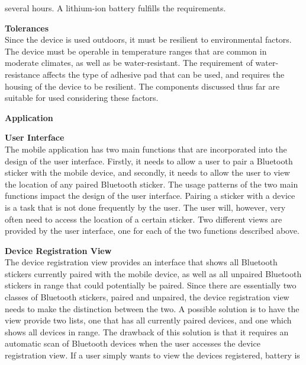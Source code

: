 \documentclass[12pt]{article}
\begin{document}
\begin{packed_enum}
\begin{packed_enum}
\begin{packed_enum}
        several hours. A lithium-ion battery fulfills the requirements.
      \end{packed_enum}
      \item \textbf{Tolerances} \\
      Since the device is used outdoors, it must be resilient to environmental factors. The device must be
      operable in temperature ranges that are common in moderate climates, as well as be water-resistant. The
      requirement of water-resistance affects the type of adhesive pad that can be used, and requires the
      housing of the device to be resilient. The components discussed thus far are suitable for used considering
      these factors.
    \end{packed_enum}
    \item \textbf{Application}
    \begin{packed_enum}
      \item \textbf{User Interface} \\
      The mobile application has two main functions that are incorporated into the design of the user interface.
      Firstly, it needs to allow a user to pair a Bluetooth sticker with the mobile device, and secondly, it 
      needs to allow the user to view the location of any paired Bluetooth sticker. The usage patterns of the
      two main functions impact the design of the user interface. Pairing a sticker with a device is a task that
      is not done frequently by the user. The user will, however, very often need to access the location of a
      certain sticker. Two different views are provided by the user interface, one for each of the two functions
      described above.
      \begin{packed_enum}
        \item \textbf{Device Registration View} \\
        The device registration view provides an interface that shows all Bluetooth stickers currently paired
        with the mobile device, as well as all unpaired Bluetooth stickers in range that could potentially be
        paired. Since there are essentially two classes of Bluetooth stickers, paired and unpaired, the device
        registration view needs to make the distinction between the two. A possible solution is to have the view
        provide two lists, one that has all currently paired devices, and one which shows all devices in range.
        The drawback of this solution is that it requires an automatic scan of Bluetooth devices when the user
        accesses the device registration view. If a user simply wants to view the devices registered, battery is

\end{packed_enum}
\end{packed_enum}
\end{packed_enum}
\end{document}
